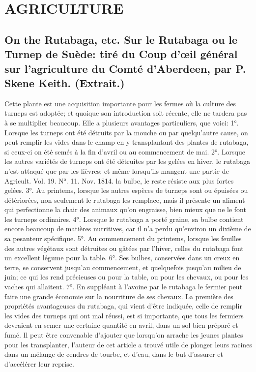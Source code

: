 \setcounter{page}{373} 
\chapter{AGRICULTURE}
\section{On the Rutabaga, etc. Sur le Rutabaga ou le Turnep de Suède: tiré du Coup d'œil général sur l'agriculture du Comté d'Aberdeen, par P. Skene Keith. \large{(Extrait.)}}
Cette plante est une acquisition importante pour les fermes où la culture des turneps est adoptée; et quoique son introduction soit récente, elle ne tardera pas à se multiplier beaucoup. Elle a plusieurs avantages particuliers, que voici:
1°. Lorsque les turneps ont été détruits par la mouche ou par quelqu'autre cause, on peut remplir les vides dans le champ en y transplantant des plantes de rutabaga, si ceux-ci on été semés à la fin d'avril ou au commencement de mai.
2°. Lorsque les autres variétés de turneps ont été détruites par les gelées en hiver, le rutabaga n'est attaqué que par les lièvres; et même lorsqu'ils mangent une partie de Agricult. Vol. 19. N°. 11. Nov. 1814.\setcounter{page}{374} la bulbe, le reste résiste aux plus fortes gelées.
3°. Au printems, lorsque les autres espèces de turneps sont ou épuisées ou détériorées, non-seulement le rutabaga les remplace, mais il présente un aliment qui perfectionne la chair des animaux qu'on engraisse, bien mieux que ne le font les turneps ordinaires.
4°. Lorsque le rutabaga a porté graine, sa bulbe contient encore beaucoup de matières nutritives, car il n'a perdu qu'environ un dixième de sa pesanteur spécifique.
5°. Au commencement du printems, lorsque les feuilles des autres végétaux sont détruites ou gâtées par l'hiver, celles du rutabaga font un excellent légume pour la table.
6°. Ses bulbes, conservées dans un creux en terre, se conservent jusqu'au commencement, et quelquefois jusqu'au milieu de juin; ce qui les rend précieuses ou pour la table, ou pour les chevaux, ou pour les vaches qui allaitent.
7°. En suppléant à l'avoine par le rutabaga le fermier peut faire une grande économie sur la nourriture de ses chevaux.
La première des propriétés avantageuses du rutabaga, qui vient d'être indiquée, celle de remplir les vides des turneps qui ont mal réussi, est si importante, que tous\setcounter{page}{375} les fermiers devraient en semer une certaine quantité en avril, dans un sol bien préparé et fumé. Il peut être convenable d'ajouter que lorsqu'on arrache les jeunes plantes pour les transplanter, l'auteur de cet article a trouvé utile de plonger leurs racines dans un mélange de cendres de tourbe, et d'eau, dans le but d'assurer et d'accélérer leur reprise.
